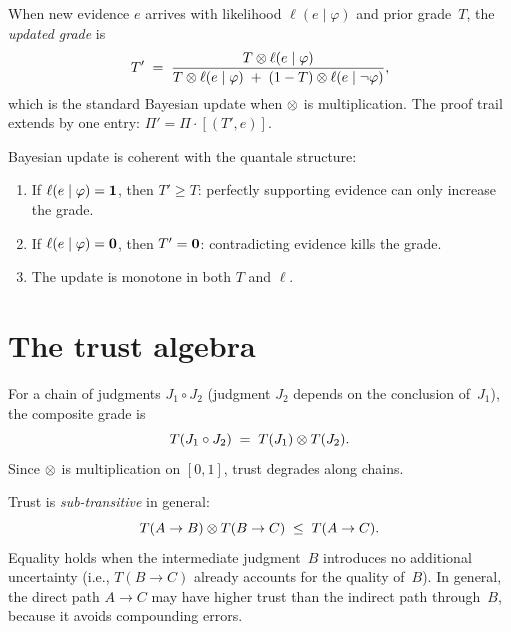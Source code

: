 \begin{definition}
\label{def:bayes}
When new evidence $e$ arrives with likelihood $\ell(e \mid \varphi)$
and prior grade~$T$, the \emph{updated grade} is
\[
  T' \;=\;
  \frac{T \otimes \ell(e \mid \varphi)}
       {T \otimes \ell(e \mid \varphi) \;+\;
        (1 - T) \otimes \ell(e \mid \neg\varphi)},
\]
which is the standard Bayesian update when $\otimes$ is multiplication.
The proof trail extends by one entry: $\Pi' = \Pi \cdot [(T', e)]$.
\end{definition}

\begin{proposition}
\label{prop:bayes-coherence}
Bayesian update is coherent with the quantale structure:
\begin{enumerate}[label=(\alph*),nosep]
\item If $\ell(e \mid \varphi) = \mathbf{1}$, then $T' \geq T$: perfectly
  supporting evidence can only increase the grade.
\item If $\ell(e \mid \varphi) = \mathbf{0}$, then $T' = \mathbf{0}$:
  contradicting evidence kills the grade.
\item The update is monotone in both $T$ and $\ell$.
\end{enumerate}
\end{proposition}

\section{The trust algebra}
\label{sec:trust-algebra}

\begin{definition}
\label{def:trust-composition-p2}
For a chain of judgments $J_1 \circ J_2$ (judgment $J_2$ depends on the
conclusion of~$J_1$), the composite grade is
\[
  T(J_1 \circ J_2) \;=\; T(J_1) \otimes T(J_2).
\]
Since $\otimes$ is multiplication on $[0,1]$, trust degrades along chains.
\end{definition}

\begin{proposition}
\label{prop:sub-transitive}
Trust is \emph{sub-transitive} in general:
\[
  T(A \to B) \otimes T(B \to C) \;\leq\; T(A \to C).
\]
Equality holds when the intermediate judgment~$B$ introduces no
additional uncertainty (i.e., $T(B \to C)$ already accounts for the
quality of~$B$).  In general, the direct path $A \to C$ may have
higher trust than the indirect path through~$B$, because it avoids
compounding errors.
\end{proposition}

